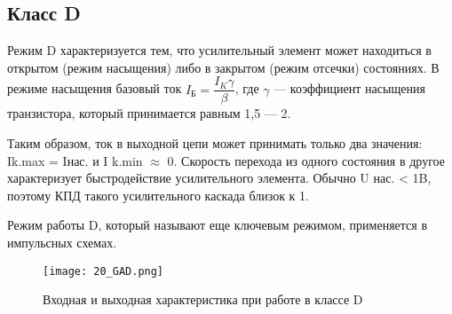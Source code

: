 \subsection*{Класс D}

Режим D характеризуется тем, что усилительный элемент может находиться в открытом  (режим насыщения) либо в закрытом (режим отсечки) состояниях. В режиме насыщения базовый ток $I_\text{Б} = \dfrac{I_K\gamma}{\beta}$, где $\gamma$ --- коэффициент насыщения транзистора, который принимается равным 1,5 --- 2.

Таким образом, ток в выходной цепи может принимать только два значения: Ik.max = Iнас. и I k.min $\approx$ 0. Скорость перехода из одного состояния в другое характеризует быстродействие усилительного элемента. Обычно U нас. < 1B, поэтому КПД такого усилительного каскада близок к 1.

Режим работы D, который называют еще ключевым режимом, применяется в импульсных схемах.

\begin{figure}[H]
\centering
\texttt{[image: 20\_GAD.png]}
\caption{Входная и выходная характеристика при работе в классе D}
\label{fig:20_GAD}
\end{figure}

